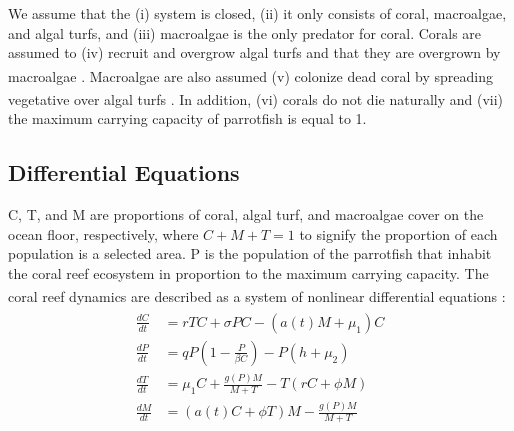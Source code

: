 \documentclass[12pt]{article}
\begin{document}
We assume that the (i) system is closed, (ii) it only consists of coral, macroalgae, and algal turfs, and (iii) macroalgae is the only predator for coral. Corals are assumed to (iv) recruit and overgrow algal turfs and that they are overgrown by macroalgae \textsuperscript{\cite{04_mathanalysis}}. Macroalgae are also assumed (v) colonize dead coral by spreading vegetative over algal turfs \textsuperscript{\cite{04_mathanalysis}}. In addition, (vi) corals do not die naturally and (vii) the maximum carrying capacity of parrotfish is equal to 1.


\subsection{Differential Equations}
C, T, and M are proportions of coral, algal turf, and macroalgae cover on the ocean floor, respectively,  where $C+M+T=1$ to signify the proportion of each population is a selected area. P is the population of the parrotfish that inhabit the coral reef ecosystem in proportion to the maximum carrying capacity. The coral reef dynamics are described as a system of nonlinear differential equations \textsuperscript{\cite{13_blackwood_hastings_mumby_2010}}: 
\begin{align}
    \begin{split}
        \frac{dC}{dt} &= rTC + \sigma P C- (a(t)M+\mu_{1})C\\
        \frac{dP}{dt} &= qP \left( 1-\frac{P}{\beta C} \right) - P \left( h+\mu_{2} \right)\\
        \frac{dT}{dt} &= \mu_{1}C + \frac{g(P)M}{M+T} - T(rC+\phi M)\\
        \frac{dM}{dt} &= (a(t)C+ \phi T)M - \frac{g(P)M}{M+T}
    \end{split}
\end{align}
\end{document}
